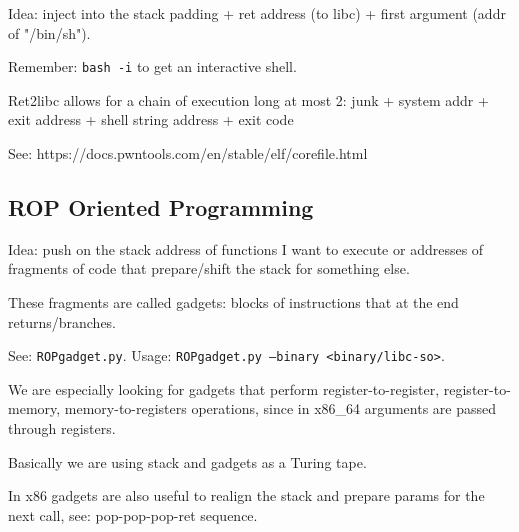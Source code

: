 Idea: inject into the stack padding + ret address (to libc) + first argument (addr of "/bin/sh").

Remember: \texttt{bash -i} to get an interactive shell.

Ret2libc allows for a chain of execution long at most 2: junk + system addr + exit address + shell string address + exit code

See: https://docs.pwntools.com/en/stable/elf/corefile.html

\subsection{ROP Oriented Programming}
Idea: push on the stack address of functions I want to execute or addresses of fragments of code that prepare/shift the stack for something else.

These fragments are called gadgets: blocks of instructions that at the end returns/branches.

See: \texttt{ROPgadget.py}. Usage: \texttt{ROPgadget.py --binary <binary/libc-so>}.

We are especially looking for gadgets that perform register-to-register, register-to-memory, memory-to-registers operations, since in x86_64 arguments are passed through registers.

Basically we are using stack and gadgets as a Turing tape.

In x86 gadgets are also useful to realign the stack and prepare params for the next call, see: pop-pop-pop-ret sequence.

